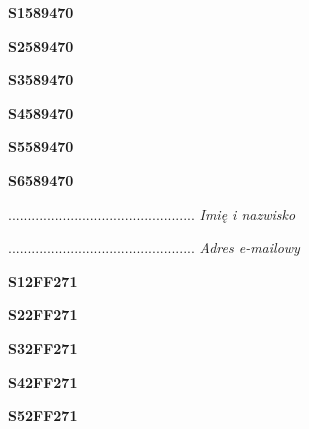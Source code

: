 \begin{turn}{90}\huge \textbf{S1589470}\end{turn}

\begin{turn}{90}\huge \textbf{S2589470}\end{turn}

\begin{turn}{90}\huge \textbf{S3589470}\end{turn}

\begin{turn}{90}\huge \textbf{S4589470}\end{turn}

\begin{turn}{90}\huge \textbf{S5589470}\end{turn}

\begin{turn}{90}\huge \textbf{S6589470}\end{turn}

\begin{turn}{90}\begin{minipage}{\linewidth} \vspace{20mm} ................................................  \textit{Imię i nazwisko}\end{minipage}\end{turn}

\begin{turn}{90}\begin{minipage}{\linewidth} \vspace{20mm} ................................................  \textit{Adres e-mailowy}\end{minipage}\end{turn}

\begin{turn}{90}\huge \textbf{S12FF271}\end{turn}

\begin{turn}{90}\huge \textbf{S22FF271}\end{turn}

\begin{turn}{90}\huge \textbf{S32FF271}\end{turn}

\begin{turn}{90}\huge \textbf{S42FF271}\end{turn}

\begin{turn}{90}\huge \textbf{S52FF271}\end{turn}


